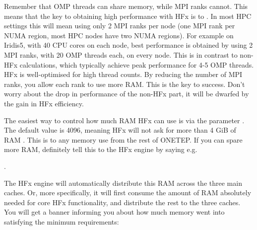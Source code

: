 \documentclass[letterpaper,10pt,english]{sphinxmanual}
\begin{document}
Remember that OMP threads can share memory, while MPI ranks cannot. This
means that the key to obtaining high performance with HFx is to . In
most HPC settings this will mean using only 2 MPI ranks per node (one
MPI rank per NUMA region, most HPC nodes have two NUMA regions). For
example on Iridis5, with 40 CPU cores on each node, best performance is
obtained by using 2 MPI ranks, with 20 OMP threads each, on every node.
This is in contrast to non-HFx calculations, which typically achieve
peak performance for 4-5 OMP threads. HFx is well-optimised for high
thread counts. By reducing the number of MPI ranks, you allow each rank
to use more RAM. This is the key to success. Don’t worry about the drop
in performance of the non-HFx part, it will be dwarfed by the gain in
HFx efficiency.

The easiest way to control how much RAM HFx can use is via the parameter
. The default value is 4096, meaning HFx will not
ask for more than 4 GiB of RAM . This is  to any memory use
from the rest of ONETEP. If you can spare more RAM, definitely tell this
to the HFx engine by saying e.g.

.

The HFx engine will automatically distribute this RAM across the three
main caches. Or, more specifically, it will first consume the amount of
RAM absolutely needed for core HFx functionality, and  distribute
the rest to the three caches. You will get a banner informing you about
how much memory went into satisfying the minimum requirements:
\end{document}
